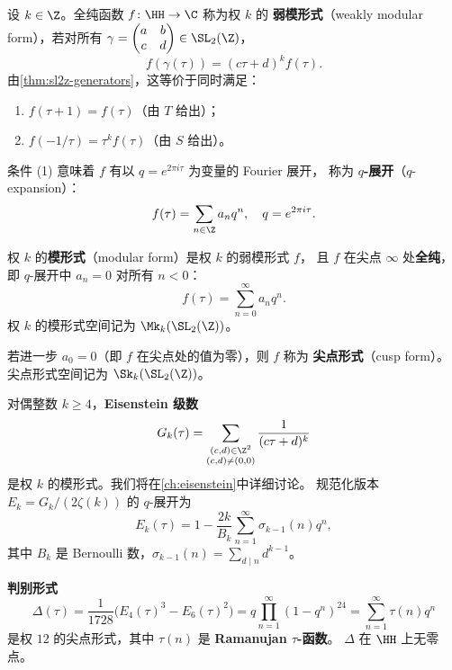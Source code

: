 \begin{definition}[权 $k$ 的弱模形式]
\label{def:weakly-modular}
设 $k \in \Z$。全纯函数 $f\colon \HH \to \C$ 称为权 $k$ 的
\textbf{弱模形式}（weakly modular form），若对所有
$\gamma = \begin{pmatrix} a & b \\ c & d \end{pmatrix} \in \SL_2(\Z)$，
\[
  f(\gamma(\tau)) = (c\tau + d)^k f(\tau).
\]
由\cref{thm:sl2z-generators}，这等价于同时满足：
\begin{enumerate}
  \item $f(\tau + 1) = f(\tau)$（由 $T$ 给出）；
  \item $f(-1/\tau) = \tau^k f(\tau)$（由 $S$ 给出）。
\end{enumerate}
\end{definition}

条件 (1) 意味着 $f$ 有以 $q = e^{2\pi i\tau}$ 为变量的 Fourier 展开，
称为 \textbf{$q$-展开}（$q$-expansion）：
\[
  f(\tau) = \sum_{n \in \Z} a_n q^n, \quad q = e^{2\pi i\tau}.
\]

\begin{definition}[模形式与尖点形式]
\label{def:modular-form}
权 $k$ 的\textbf{模形式}（modular form）是权 $k$ 的弱模形式 $f$，
且 $f$ 在尖点 $\infty$ 处\textbf{全纯}，即 $q$-展开中 $a_n = 0$ 对所有 $n < 0$：
\[
  f(\tau) = \sum_{n=0}^{\infty} a_n q^n.
\]
权 $k$ 的模形式空间记为 $\Mk_k(\SL_2(\Z))$。

若进一步 $a_0 = 0$（即 $f$ 在尖点处的值为零），则 $f$ 称为
\textbf{尖点形式}（cusp form）。尖点形式空间记为 $\Sk_k(\SL_2(\Z))$。
\end{definition}

\begin{example}[Eisenstein 级数]
\label{ex:eisenstein-preview}
对偶整数 $k \geq 4$，\textbf{Eisenstein 级数}
\[
  G_k(\tau) = \sum_{\substack{(c,d) \in \Z^2 \\ (c,d) \neq (0,0)}}
  \frac{1}{(c\tau + d)^k}
\]
是权 $k$ 的模形式。我们将在\cref{ch:eisenstein}中详细讨论。
规范化版本 $E_k = G_k / (2\zeta(k))$ 的 $q$-展开为
\[
  E_k(\tau) = 1 - \frac{2k}{B_k} \sum_{n=1}^{\infty} \sigma_{k-1}(n) q^n,
\]
其中 $B_k$ 是 Bernoulli 数，$\sigma_{k-1}(n) = \sum_{d \mid n} d^{k-1}$。
\end{example}

\begin{example}
\label{ex:discriminant-form}
\textbf{判别形式}
\[
  \Delta(\tau) = \frac{1}{1728}\bigl(E_4(\tau)^3 - E_6(\tau)^2\bigr)
  = q \prod_{n=1}^{\infty}(1 - q^n)^{24}
  = \sum_{n=1}^{\infty} \tau(n) q^n
\]
是权 $12$ 的尖点形式，其中 $\tau(n)$ 是 \textbf{Ramanujan $\tau$-函数}。
$\Delta$ 在 $\HH$ 上无零点。
\end{example}

